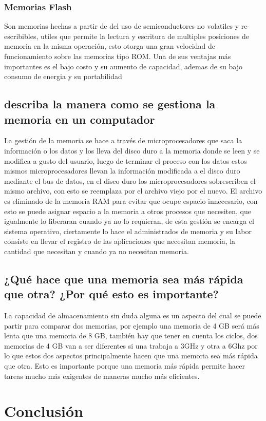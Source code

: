 \documentclass{article}
\begin{document}
        
        
        
        
        \subsubsection{Memorias Flash}
        Son memorias hechas a partir de del uso de semiconductores no volatiles y re-escribibles, utiles que permite la lectura y escritura de multiples posiciones de memoria en la misma operación, esto otorga una gran velocidad de funcionamiento sobre las memorias tipo ROM. Una de sus ventajas más importantes es el bajo costo y su aumento de capacidad, ademas de su bajo consumo de energia y su portabilidad 
        
    
    
    \subsection{describa la manera como se gestiona la memoria en un computador}
    La gestión de la memoria se hace a través de microprocesadores que saca la información o los datos y los lleva del disco duro a la memoria donde se  leen y se modifica a gusto del usuario, luego de terminar el proceso con los datos estos mismos microprocesadores llevan la información modificada a el disco duro mediante el bus de datos, en el disco duro los microprocesadores sobrescriben el mismo archivo, con esto se reemplaza por el archivo viejo por el nuevo. 
    El archivo es eliminado de la memoria RAM para evitar que ocupe espacio innecesario, con esto se puede asignar espacio a la memoria a otros procesos que necesiten, que igualmente lo liberaran cuando ya no lo requieran, de esta gestión se encarga el sistema operativo, ciertamente lo hace el administrados de memoria y su labor consiste en llevar el registro de las aplicaciones que necesitan memoria, la cantidad que necesitan y cuando ya no necesitan memoria.
 
    
    
    \subsection{¿Qué hace que una memoria sea más rápida que otra? ¿Por qué esto es importante?}
    La capacidad de almacenamiento sin duda alguna es un aspecto del cual se puede partir para comparar dos memorias, por ejemplo una memoria de 4 GB será más lenta que una memoria de 8 GB, también hay que tener en cuenta los ciclos, dos memorias de 4 GB van a ser diferentes si una trabaja a 3GHz y otra a 6Ghz por lo que estos dos aspectos principalmente hacen que una memoria sea más rápida que otra. Esto es importante porque una memoria más rápida permite hacer tareas mucho más exigentes de maneras mucho más eficientes. 


\section{Conclusión} \label{conclulsion}



\end{document}
